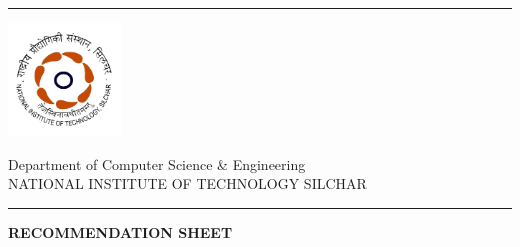 \vspace*{0.5\fill}
\setlength{\headsep}{0.4in}
\rule{\linewidth}{1mm}
\begin{minipage}{0.2\textwidth}
\includegraphics[width=3cm,keepaspectratio]{images/NIT_Silchar_logo.png}
\end{minipage}
\begin{minipage}{\textwidth}
\large{Department of Computer Science \& Engineering}\\
\large{\MakeUppercase{NATIONAL INSTITUTE OF TECHNOLOGY SILCHAR}}
\end{minipage}

{\noindent\rule{\linewidth}{1mm}} \vspace{0.25in}

\begin{center}

{\bf \LARGE RECOMMENDATION SHEET}

\end{center}


